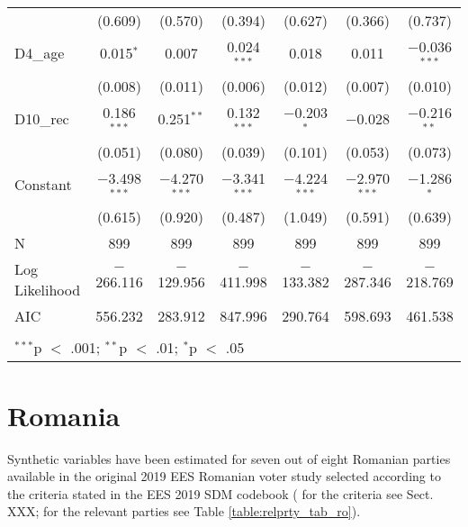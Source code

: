 \documentclass[
]{article}
\begin{document}
\begin{table}[!htbp]
\begin{tabular}{@{\extracolsep{5pt}}lcccccc}
  & (0.609) & (0.570) & (0.394) & (0.627) & (0.366) & (0.737) \\ 
  D4\_age & 0.015$^{*}$ & 0.007 & 0.024$^{***}$ & 0.018 & 0.011 & $-$0.036$^{***}$ \\ 
  & (0.008) & (0.011) & (0.006) & (0.012) & (0.007) & (0.010) \\ 
  D10\_rec & 0.186$^{***}$ & 0.251$^{**}$ & 0.132$^{***}$ & $-$0.203$^{*}$ & $-$0.028 & $-$0.216$^{**}$ \\ 
  & (0.051) & (0.080) & (0.039) & (0.101) & (0.053) & (0.073) \\ 
  Constant & $-$3.498$^{***}$ & $-$4.270$^{***}$ & $-$3.341$^{***}$ & $-$4.224$^{***}$ & $-$2.970$^{***}$ & $-$1.286$^{*}$ \\ 
  & (0.615) & (0.920) & (0.487) & (1.049) & (0.591) & (0.639) \\ 
 N & 899 & 899 & 899 & 899 & 899 & 899 \\ 
Log Likelihood & $-$266.116 & $-$129.956 & $-$411.998 & $-$133.382 & $-$287.346 & $-$218.769 \\ 
AIC & 556.232 & 283.912 & 847.996 & 290.764 & 598.693 & 461.538 \\ 
\hline \\[-1.8ex] 
\multicolumn{7}{l}{$^{***}$p $<$ .001; $^{**}$p $<$ .01; $^{*}$p $<$ .05} \\ 
\end{tabular} 
\end{table}

\clearpage

\newpage

\hypertarget{romania}{%
\section{Romania}\label{romania}}

Synthetic variables have been estimated for seven out of eight Romanian parties available in the original
2019 EES Romanian voter study selected according to the criteria stated in the EES 2019 SDM codebook (
for the criteria see Sect. XXX; for the relevant parties see Table \ref{table:relprty_tab_ro}).
\end{document}

